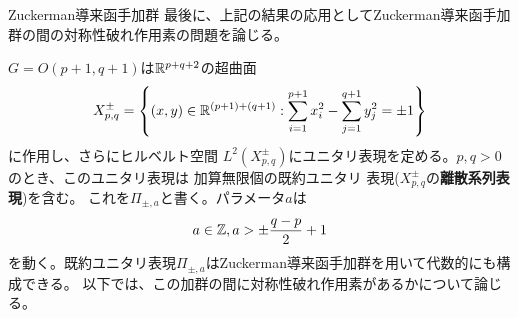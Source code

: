 \begin{frame}{Zuckerman導来函手加群}
	最後に、上記の結果の応用としてZuckerman導来函手加群の間の対称性破れ作用素の問題を論じる。

	$G=O(p+1,q+1)$は$\mathbb{R}^{p+q+2}$の超曲面\begin{equation*}
		X_{p,q}^\pm=\left\{ (x,y)\in\R^{(p+1)+(q+1)}:\sum_{i=1}^{p+1}x_i^2-\sum_{j=1}^{q+1}y_j^2=\pm1 \right\}
	\end{equation*}
	に作用し、さらにヒルベルト空間
	$L^2(X_{p,q}^\pm)$にユニタリ表現を定める。$p,q>0$のとき、このユニタリ表現は
	加算無限個の既約ユニタリ
	表現($X_{p,q}^\pm$の\textbf{離散系列表現})を含む。
	これを$\Pi_{\pm,a}$と書く。パラメータ$a$は\begin{equation*}
		a\in\mathbb{Z},a>\pm\frac{q-p}{2}+1
	\end{equation*}を動く。既約ユニタリ表現$\Pi_{\pm,a}$はZuckerman導来函手加群を用いて代数的に{も}構成できる。
以下では、この加群の間に対称性破れ作用素がある{か}について論じる。
\end{frame}
\newcommand{\zuk}{Zuckerman導来加群函手加群}

